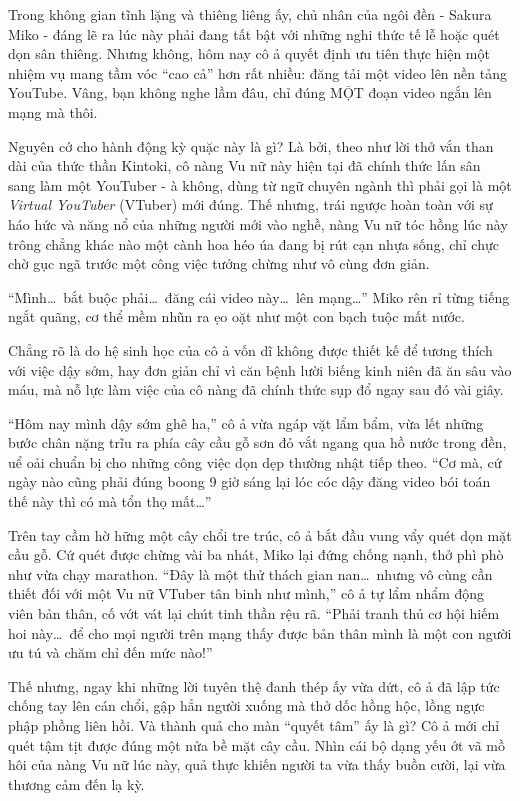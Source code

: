 \documentclass[../main.tex]{subfiles}
\begin{document}
Trong không gian tĩnh lặng và thiêng liêng ấy, chủ nhân của ngôi đền - Sakura Miko - đáng lẽ ra lúc này phải đang tất bật với những nghi thức tế lễ hoặc quét dọn sân thiêng. Nhưng không, hôm nay cô ả quyết định ưu tiên thực hiện một nhiệm vụ mang tầm vóc ``cao cả'' hơn rất nhiều: đăng tải một video lên nền tảng YouTube. Vâng, bạn không nghe lầm đâu, chỉ đúng MỘT đoạn video ngắn lên mạng mà thôi.

Nguyên cớ cho hành động kỳ quặc này là gì? Là bởi, theo như lời thở vắn than dài của thức thần Kintoki, cô nàng Vu nữ này hiện tại đã chính thức lấn sân sang làm một YouTuber - à không, dùng từ ngữ chuyên ngành thì phải gọi là một \textit{Virtual YouTuber} (VTuber) mới đúng. Thế nhưng, trái ngược hoàn toàn với sự háo hức và năng nổ của những người mới vào nghề, nàng Vu nữ tóc hồng lúc này trông chẳng khác nào một cành hoa héo úa đang bị rút cạn nhựa sống, chỉ chực chờ gục ngã trước một công việc tưởng chừng như vô cùng đơn giản.


``Mình\dots\ bắt buộc phải\dots\ đăng cái video này\dots\ lên mạng\dots'' Miko rên rỉ từng tiếng ngắt quãng, cơ thể mềm nhũn ra ẹo oặt như một con bạch tuộc mất nước.

Chẳng rõ là do hệ sinh học của cô ả vốn dĩ không được thiết kế để tương thích với việc dậy sớm, hay đơn giản chỉ vì căn bệnh lười biếng kinh niên đã ăn sâu vào máu, mà nỗ lực làm việc của cô nàng đã chính thức sụp đổ ngay sau đó vài giây.

\ct

``Hôm nay mình dậy sớm ghê ha,'' cô ả vừa ngáp vặt lẩm bẩm, vừa lết những bước chân nặng trĩu ra phía cây cầu gỗ sơn đỏ vắt ngang qua hồ nước trong đền, uể oải chuẩn bị cho những công việc dọn dẹp thường nhật tiếp theo. ``Cơ mà, cứ ngày nào cũng phải đúng boong 9 giờ sáng lại lóc cóc dậy đăng video bói toán thế này thì có mà tổn thọ mất\dots''

Trên tay cầm hờ hững một cây chổi tre trúc, cô ả bắt đầu vung vẩy quét dọn mặt cầu gỗ. Cứ quét được chừng vài ba nhát, Miko lại đứng chống nạnh, thở phì phò như vừa chạy marathon. ``Đây là một thử thách gian nan\dots\ nhưng vô cùng cần thiết đối với một Vu nữ VTuber tân binh như mình,'' cô ả tự lẩm nhẩm động viên bản thân, cố vớt vát lại chút tinh thần rệu rã. ``Phải tranh thủ cơ hội hiếm hoi này\dots\ để cho mọi người trên mạng thấy được bản thân mình là một con người ưu tú và chăm chỉ đến mức nào!''

Thế nhưng, ngay khi những lời tuyên thệ đanh thép ấy vừa dứt, cô ả đã lập tức chống tay lên cán chổi, gập hẳn người xuống mà thở dốc hồng hộc, lồng ngực phập phồng liên hồi. Và thành quả cho màn ``quyết tâm'' ấy là gì? Cô ả mới chỉ quét tậm tịt được đúng một nửa bề mặt cây cầu. Nhìn cái bộ dạng yếu ớt vã mồ hôi của nàng Vu nữ lúc này, quả thực khiến người ta vừa thấy buồn cười, lại vừa thương cảm đến lạ kỳ.
\end{document}
